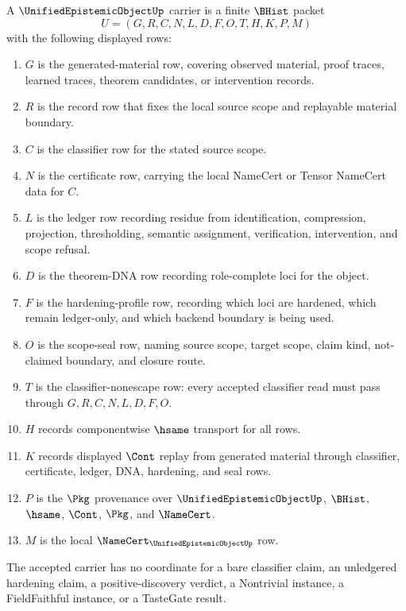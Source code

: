 \begin{definition}
\label{def:unified-epistemic-object-carrier}
A $\UnifiedEpistemicObjectUp$ carrier is a finite $\BHist$ packet
$$
U=(G,R,C,N,L,D,F,O,T,H,K,P,M)
$$
with the following displayed rows:
\begin{enumerate}
\item $G$ is the generated-material row, covering observed material, proof traces, learned traces, theorem candidates, or intervention records.
\item $R$ is the record row that fixes the local source scope and replayable material boundary.
\item $C$ is the classifier row for the stated source scope.
\item $N$ is the certificate row, carrying the local NameCert or Tensor NameCert data for $C$.
\item $L$ is the ledger row recording residue from identification, compression, projection, thresholding, semantic assignment, verification, intervention, and scope refusal.
\item $D$ is the theorem-DNA row recording role-complete loci for the object.
\item $F$ is the hardening-profile row, recording which loci are hardened, which remain ledger-only, and which backend boundary is being used.
\item $O$ is the scope-seal row, naming source scope, target scope, claim kind, not-claimed boundary, and closure route.
\item $T$ is the classifier-nonescape row: every accepted classifier read must pass through $G,R,C,N,L,D,F,O$.
\item $H$ records componentwise $\hsame$ transport for all rows.
\item $K$ records displayed $\Cont$ replay from generated material through classifier, certificate, ledger, DNA, hardening, and seal rows.
\item $P$ is the $\Pkg$ provenance over $\UnifiedEpistemicObjectUp$, $\BHist$, $\hsame$, $\Cont$, $\Pkg$, and $\NameCert$.
\item $M$ is the local $\NameCert_{\UnifiedEpistemicObjectUp}$ row.
\end{enumerate}
The accepted carrier has no coordinate for a bare classifier claim, an unledgered hardening claim, a positive-discovery verdict, a Nontrivial instance, a FieldFaithful instance, or a TasteGate result.
\end{definition}

